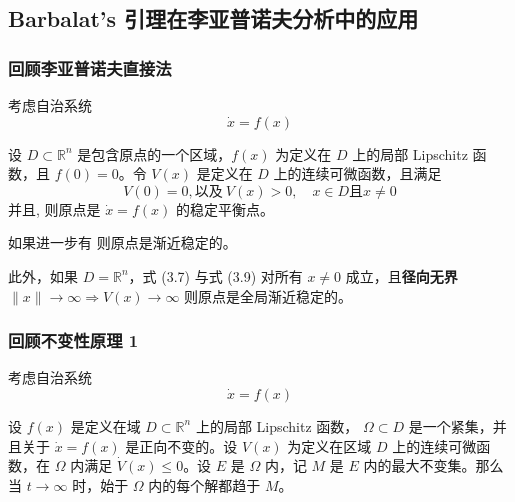 \subsection{Barbalat's 引理在李亚普诺夫分析中的应用}

\begin{frame}
  \frametitle{回顾李亚普诺夫直接法}

  考虑自治系统
  \[
  \dot{x} = f(x) \tag{1}
  \]
  
  \begin{theorem}
    \parencite[定理 3.3]{khalilNonlinearControl2015}
    设 $D \subset \mathbb{R}^n$ 是包含原点的一个区域，$f(x)$ 为定义在 $D$ 上的局部 Lipschitz 函数，且 $f(0)=0$。令 $V(x)$ 是定义在 $D$ 上的连续可微函数，且满足
    \[
    V(0) = 0, \text{以及}\ V(x) > 0,\quad x \in D \text{且} x \neq 0 \tag{3.7}
    \]
    并且, 
    则原点是 $\dot{x}=f(x)$ 的稳定平衡点。
    
    如果进一步有
    则原点是渐近稳定的。
    
    此外，如果 $D=\mathbb{R}^n$，式 (3.7) 与式 (3.9) 对所有 $x \neq 0$ 成立，且\textbf{径向无界}
    \(
    \|x\| \to \infty \Rightarrow V(x) \to \infty
    \)
    则原点是全局渐近稳定的。
  \end{theorem}
\end{frame}

\begin{frame}
  \frametitle{回顾不变性原理 1}
  考虑自治系统
\[
\dot{x} = f(x) \tag{1}
\]

\begin{theorem}
\parencite[定理 3.4]{khalilNonlinearControl2015,LaSalle1960}
设 $f(x)$ 是定义在域 $D\subset\mathbb{R}^n$ 上的局部 Lipschitz 函数， $\Omega\subset D$ 是一个紧集，并且关于 $\dot{x}=f(x)$ 是正向不变的。设 $V(x)$ 为定义在区域 $D$ 上的连续可微函数，在 $\Omega$ 内满足 $\dot{V}(x)\leq 0$。设 $E$ 是 $\Omega$ 内，记 $M$ 是 $E$ 内的最大不变集。那么当 $t\to\infty$ 时，始于 $\Omega$ 内的每个解都趋于 $M$。
\end{theorem}

\end{frame}

